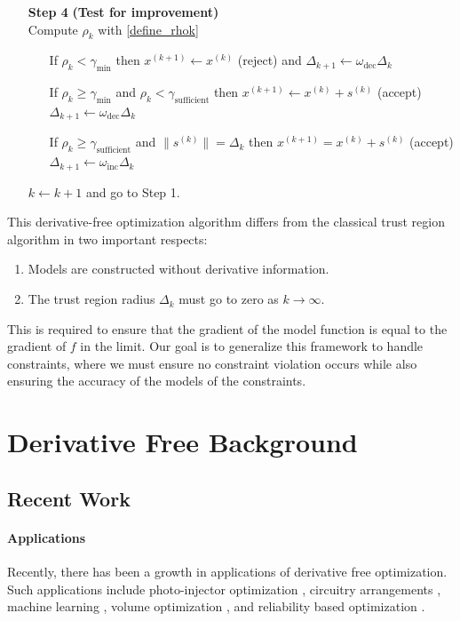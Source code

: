 \documentclass{article}
\theoremstyle{case}
\newcommand{\gammabi}{\gamma_{\text{sufficient}}}
\newcommand{\gammasm}{\gamma_{\text{min}}}
\newcommand{\mfk}{{{m}_f}^{(k)}}
\newcommand{\omegadec}{\omega_{\text{dec}}}
\newcommand{\omegainc}{\omega_{\text{inc}}}
\newcommand{\rk}{\rho_k}
\newcommand{\sk}{{{s}^{(k)}}}
\newcommand{\xkpo}{{{x}^{(k+1)}}}
\newcommand{\xk}{{x^{(k)}}}
\begin{document}
\begin{algorithm}[H]
\begin{itemize}
        \item[\textbf{Step 4}] \textbf{(Test for improvement)} \\
            Compute $\rk$ with \cref{define_rhok} \begin{itemize}
                \item[] If $\rk < \gammasm$ then $\xkpo \gets \xk$ (reject) and $\Delta_{k+1} \gets \omegadec\Delta_{k}$
                \item[] If $\rk \ge \gammasm$ and $\rk < \gammabi$ then $\xkpo\gets\xk+\sk$ (accept) $\Delta_{k+1} \gets \omegadec\Delta_{k}$
                \item[] If $\rk \ge \gammabi$ and $\|\sk\| = \Delta_{k}$ then $\xkpo=\xk+\sk$ (accept) $\Delta_{k+1} \gets \omegainc\Delta_{k}$
            \end{itemize}
            $k \gets k+1$ and go to Step 1.
    \end{itemize}
\end{algorithm}

This derivative-free optimization algorithm differs from the classical trust region algorithm in two important respects:
\begin{enumerate}
    \item Models are constructed without derivative information.
    \item The trust region radius $\Delta_k$ must go to zero as $k\to\infty$.
\end{enumerate}

This is required to ensure that the gradient of the model function is equal to the gradient of $f$ in the limit.
Our goal is to generalize this framework to handle constraints, where we must ensure no constraint violation occurs while also ensuring the accuracy of the models of the constraints.

\section{Derivative Free Background}
\subsection{Recent Work}
\paragraph{Applications}

Recently, there has been a growth in applications of derivative free optimization.
Such applications include photo-injector optimization \cite{1742-6596-874-1-012062}, circuitry arrangements \cite{PLOSKAS201816}, machine learning \cite{KS2018}, volume optimization \cite{Cheng2017}, and reliability based optimization \cite{Gao2017}.
\end{document}
